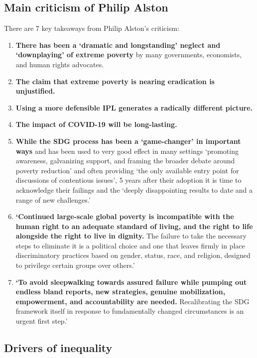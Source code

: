 \documentclass[../summary.tex]{subfiles}
\begin{document}
	\subsection{Main criticism of Philip Alston}
	
	There are 7 key takeaways from Philip Alston's criticism:
	\begin{enumerate}
		\item \textbf{There has been a `dramatic and longstanding' neglect and `downplaying' of extreme poverty} by many governments, economists, and human rights advocates.
		\item \textbf{The claim that extreme poverty is nearing eradication is unjustified.}
		\item \textbf{Using a more defensible IPL generates a radically different picture.}
		\item \textbf{The impact of COVID-19 will be long-lasting.}
		\item \textbf{While the SDG process has been a `game-changer' in important ways} and has been used to very good effect in many settings `promoting awareness, galvanizing support, and framing the broader debate around poverty reduction' and often providing `the only available entry point for discussions of contentious issues', 5 years after their adoption it is time to acknowledge their failings and the `deeply disappointing results to date and a range of new challenges.'
		\item \textbf{`Continued large-scale global poverty is incompatible with the human right to an adequate standard of living, and the right to life alongside the right to live in dignity.} The failure to take the necessary steps to eliminate it is a political choice and one that leaves firmly in place discriminatory practices based on gender, status, race, and religion, designed to privilege certain groups over others.' 
		\item \textbf{`To avoid sleepwalking towards assured failure while pumping out endless bland reports, new strategies, genuine mobilization, empowerment, and accountability are needed.} Recalibrating the SDG framework itself in response to fundamentally changed circumstances is an urgent first step.'
	\end{enumerate}
	
	\subsection{Drivers of inequality}
	
\end{document}
